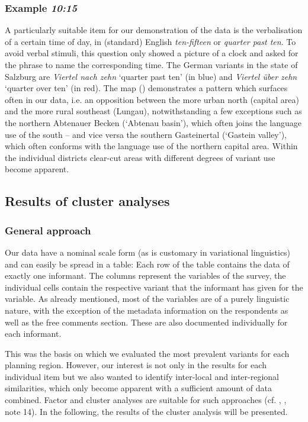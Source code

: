 \documentclass[output=paper,colorlinks, citecolor=brown]{langscibook}
\begin{document}
\subsubsection{Example \textit{10:15}} \label{sec:blaßnigg:3.2.2}
A particularly suitable item for our demonstration of the data is the verbalisation of a certain time of day, in (standard) English \textit{ten-fifteen} or \textit{quarter past ten}. To avoid verbal stimuli, this question only showed a picture of a clock and asked for the phrase to name the corresponding time. The German variants in the state of Salzburg are \textit{Viertel nach zehn} `quarter past ten' (in blue) and \textit{Viertel über zehn} `quarter over ten' (in red). The map () demonstrates a pattern which surfaces often in our data, i.e. an opposition between the more urban north (capital area) and the more rural southeast (Lungau), notwithstanding a few exceptions such as the northern Abtenauer Becken (`Abtenau basin'), which often joins the language use of the south – and vice versa the southern Gasteinertal (`Gastein valley'), which often conforms with the language use of the northern capital area. Within the individual districts clear-cut areas with different degrees of variant use become apparent.

\subsection{Results of cluster analyses} \label{sec:blaßnigg:3.3}
\subsubsection{General approach} \label{sec:blaßnigg:3.3.1}

Our data have a nominal scale form (as is customary in variational linguistics) and can easily be spread in a table: Each row of the table contains the data of exactly one informant. The columns represent the variables of the survey, the individual cells contain the respective variant that the informant has given for the variable. As already mentioned, most of the variables are of a purely linguistic nature, with the exception of the metadata information on the respondents as well as the free comments section. These are also documented individually for each informant.

This was the basis on which we evaluated the most prevalent variants for each planning region. However, our interest is not only in the results for each individual item but we also wanted to identify inter-local and inter-regional similarities, which only become apparent with a sufficient amount of  data combined. Factor and cluster analyses are suitable for such approaches (cf. \citealt[509]{Goebl2005}, \citealt[234--235]{PröllEtAl2021}, note  14). In the following, the results of the cluster analysis will be presented.
\end{document}
